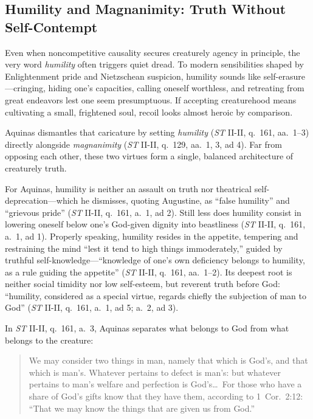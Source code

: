 \subsection{Humility and Magnanimity: Truth Without Self-Contempt}

Even when noncompetitive causality secures creaturely agency in principle, the very word \emph{humility} often triggers quiet dread. To modern sensibilities shaped by Enlightenment pride and Nietzschean suspicion, humility sounds like self-erasure---cringing, hiding one's capacities, calling oneself worthless, and retreating from great endeavors lest one seem presumptuous. If accepting creaturehood means cultivating a small, frightened soul, recoil looks almost heroic by comparison.

Aquinas dismantles that caricature by setting \emph{humility} (\emph{ST} II-II, q.\ 161, aa.\ 1--3) directly alongside \emph{magnanimity} (\emph{ST} II-II, q.\ 129, aa.\ 1, 3, ad 4). Far from opposing each other, these two virtues form a single, balanced architecture of creaturely truth.

For Aquinas, humility is neither an assault on truth nor theatrical self-deprecation---which he dismisses, quoting Augustine, as ``false humility'' and ``grievous pride'' (\emph{ST} II-II, q.\ 161, a.\ 1, ad 2). Still less does humility consist in lowering oneself below one's God-given dignity into beastliness (\emph{ST} II-II, q.\ 161, a.\ 1, ad 1). Properly speaking, humility resides in the appetite, tempering and restraining the mind ``lest it tend to high things immoderately,'' guided by truthful self-knowledge---``knowledge of one's own deficiency belongs to humility, as a rule guiding the appetite'' (\emph{ST} II-II, q.\ 161, aa.\ 1--2). Its deepest root is neither social timidity nor low self-esteem, but reverent truth before God: ``humility, considered as a special virtue, regards chiefly the subjection of man to God'' (\emph{ST} II-II, q.\ 161, a.\ 1, ad 5; a.\ 2, ad 3).

In \emph{ST} II-II, q.\ 161, a.\ 3, Aquinas separates what belongs to God from what belongs to the creature:

\begin{quote}
We may consider two things in man, namely that which is God's, and that which is man's. Whatever pertains to defect is man's: but whatever pertains to man's welfare and perfection is God's\dots\ For those who have a share of God's gifts know that they have them, according to 1~Cor.\ 2:12: ``That we may know the things that are given us from God.''
\end{quote}

